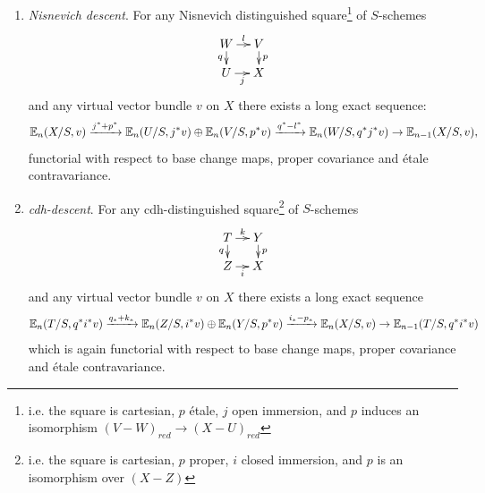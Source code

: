 \begin{prop}
\begin{enumerate}[resume]
with complementary open immersion $j:U \rightarrow X$, and any virtual vector bundle $v$ on $X$ there exists a long exact sequence of the form:
$$
\E_{n}(Z/S,i^*v) \xrightarrow{i_*}
\E_{n}(X/S,v) \xrightarrow{j^*}
\E_{n}(U/S,j^*v) \xrightarrow{\partial}
\E_{n-1}(Z/S,i^*v)
$$
which is natural with respect to base change, proper covariance and  \'etale contravariance.
\item \emph{Nisnevich descent}. For any Nisnevich distinguished square\footnote{i.e. the square is cartesian, $p$ \'etale, $j$ open immersion,
and $p$ induces an isomorphism $(V-W)_{red} \rightarrow (X-U)_{red}$} of $S$-schemes 
$$
\xymatrix@=10pt{
W\ar^-l[r]\ar_-q[d] & V\ar^-p[d] \\
U\ar_-j[r] & X
}
$$
and any virtual vector bundle $v$ on $X$ there exists a long exact sequence:
$$
\mathbb E_{n}(X/S,v)
\xrightarrow{j^*+p^*} \mathbb E_{n}(U/S,j^*v) \oplus \mathbb E_{n}(V/S,p^*v)
\xrightarrow{q^*-l^*} \mathbb E_{n}(W/S,q^*j^*v)
\rightarrow \mathbb E_{n-1}(X/S,v),
$$
functorial with respect to base change maps, proper covariance and étale contravariance.
\item \emph{cdh-descent}. For any cdh-distinguished square\footnote{i.e. the square is cartesian, $p$ proper, $i$ closed immersion,
and $p$ is an isomorphism over $(X-Z)$} of $S$-schemes 
$$
\xymatrix@=10pt{
T\ar_-q[d]\ar^-k[r] & Y\ar^-p[d] \\
Z\ar_-i[r] & X
}
$$
and any virtual vector bundle $v$ on $X$ there exists a long exact sequence
\[
\mathbb E_{n}(T/S,q^*i^*v)
\xrightarrow{q_*+k_*} \mathbb E_{n}(Z/S,i^*v) \oplus \mathbb E_{n}(Y/S,p^*v)
\xrightarrow{i_*-p_*} \mathbb E_{n}(X/S,v)
\rightarrow \mathbb E_{n-1}(T/S,q^*i^*v)
\]
which is again functorial with respect to base change maps, proper covariance and étale contravariance.
\end{enumerate}
\end{prop}

